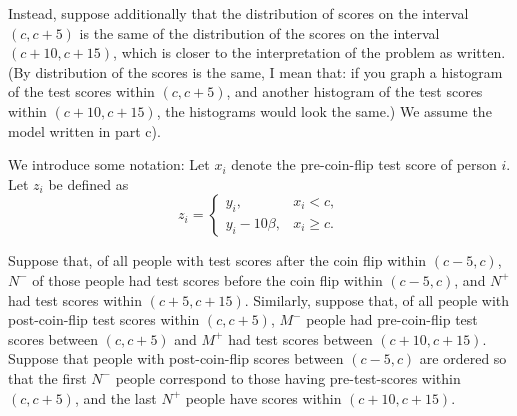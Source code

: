 \documentclass{article}
\begin{document}
\begin{itemize}
\begin{itemize}
       Instead, suppose additionally that the distribution of scores on the interval
       $(c, c+5)$ is the same of the distribution of the scores on the interval $(c+10,c+15)$,
       which is closer to the interpretation of the problem as written.
       (By distribution of the scores is the same, I mean that: if you graph a histogram
       of the test scores within $(c,c+5)$, and another histogram 
       of the test scores within $(c+10,c+15)$,
       the histograms would look the same.)
       We assume the model written in part c).

       We introduce some notation:
       Let $x_i$ denote the pre-coin-flip test score of person $i$.
       Let $z_i$ be defined as
       $$
         z_i = \left \{
           \begin{array}{ll}
             y_i, & x_i < c, \\
             y_i - 10\beta, & x_i \geq c.
           \end{array}
         \right.
       $$
              
       Suppose that, of all people with test scores after the coin flip 
       within $(c - 5, c)$, $N^-$ of those people
       had test scores before the coin flip within $(c-5, c)$,
       and $N^+$ had test scores within $(c+5, c+15)$.
       Similarly, suppose that, of all people with post-coin-flip test scores
       within $(c,c+5)$, $M^-$ people had pre-coin-flip test scores between
       $(c,c+5)$ and $M^+$ had test scores between $(c+10,c+15)$.
       Suppose that people with post-coin-flip scores between $(c-5,c)$
       are ordered so that the first $N^-$ people correspond to those having
       pre-test-scores within $(c,c+5)$, and the last $N^+$ people have
       scores within $(c+10,c+15)$.
       

\end{itemize}
\end{itemize}
\end{document}

